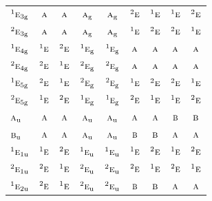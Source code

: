 \documentclass[10pt,a4paper]{article}
\numberwithin{equation}{section}
\newcommand{\irr}[1]{\text{\normalfont\scshape #1}}
\newcommand{\conjpair}[1]{{}^{#1}}
\newcommand{\ptag}[1]{\mathrm{#1}}
\begin{document}
{\begin{longtable}{@{}lcccccccc@{}}
$\conjpair{1}\irr{e}_{3\ptag{g}}$ & $\irr{a}$ & $\irr{a}$ & $\irr{a}_{\ptag{g}}$ & $\irr{a}_{\ptag{g}}$ & $\conjpair{2}\irr{e}$ & $\conjpair{1}\irr{e}$ & $\conjpair{1}\irr{e}$ & $\conjpair{2}\irr{e}$\\
$\conjpair{2}\irr{e}_{3\ptag{g}}$ & $\irr{a}$ & $\irr{a}$ & $\irr{a}_{\ptag{g}}$ & $\irr{a}_{\ptag{g}}$ & $\conjpair{1}\irr{e}$ & $\conjpair{2}\irr{e}$ & $\conjpair{2}\irr{e}$ & $\conjpair{1}\irr{e}$\\
$\conjpair{1}\irr{e}_{4\ptag{g}}$ & $\conjpair{1}\irr{e}$ & $\conjpair{2}\irr{e}$ & $\conjpair{1}\irr{e}_{\ptag{g}}$ & $\conjpair{1}\irr{e}_{\ptag{g}}$ & $\irr{a}$ & $\irr{a}$ & $\irr{a}$ & $\irr{a}$\\
$\conjpair{2}\irr{e}_{4\ptag{g}}$ & $\conjpair{2}\irr{e}$ & $\conjpair{1}\irr{e}$ & $\conjpair{2}\irr{e}_{\ptag{g}}$ & $\conjpair{2}\irr{e}_{\ptag{g}}$ & $\irr{a}$ & $\irr{a}$ & $\irr{a}$ & $\irr{a}$\\
$\conjpair{1}\irr{e}_{5\ptag{g}}$ & $\conjpair{2}\irr{e}$ & $\conjpair{1}\irr{e}$ & $\conjpair{2}\irr{e}_{\ptag{g}}$ & $\conjpair{2}\irr{e}_{\ptag{g}}$ & $\conjpair{1}\irr{e}$ & $\conjpair{2}\irr{e}$ & $\conjpair{2}\irr{e}$ & $\conjpair{1}\irr{e}$\\
$\conjpair{2}\irr{e}_{5\ptag{g}}$ & $\conjpair{1}\irr{e}$ & $\conjpair{2}\irr{e}$ & $\conjpair{1}\irr{e}_{\ptag{g}}$ & $\conjpair{1}\irr{e}_{\ptag{g}}$ & $\conjpair{2}\irr{e}$ & $\conjpair{1}\irr{e}$ & $\conjpair{1}\irr{e}$ & $\conjpair{2}\irr{e}$\\
$\irr{a}_{\ptag{u}}$ & $\irr{a}$ & $\irr{a}$ & $\irr{a}_{\ptag{u}}$ & $\irr{a}_{\ptag{u}}$ & $\irr{a}$ & $\irr{a}$ & $\irr{b}$ & $\irr{b}$\\
$\irr{b}_{\ptag{u}}$ & $\irr{a}$ & $\irr{a}$ & $\irr{a}_{\ptag{u}}$ & $\irr{a}_{\ptag{u}}$ & $\irr{b}$ & $\irr{b}$ & $\irr{a}$ & $\irr{a}$\\
$\conjpair{1}\irr{e}_{1\ptag{u}}$ & $\conjpair{1}\irr{e}$ & $\conjpair{2}\irr{e}$ & $\conjpair{1}\irr{e}_{\ptag{u}}$ & $\conjpair{1}\irr{e}_{\ptag{u}}$ & $\conjpair{1}\irr{e}$ & $\conjpair{2}\irr{e}$ & $\conjpair{1}\irr{e}$ & $\conjpair{2}\irr{e}$\\
$\conjpair{2}\irr{e}_{1\ptag{u}}$ & $\conjpair{2}\irr{e}$ & $\conjpair{1}\irr{e}$ & $\conjpair{2}\irr{e}_{\ptag{u}}$ & $\conjpair{2}\irr{e}_{\ptag{u}}$ & $\conjpair{2}\irr{e}$ & $\conjpair{1}\irr{e}$ & $\conjpair{2}\irr{e}$ & $\conjpair{1}\irr{e}$\\
$\conjpair{1}\irr{e}_{2\ptag{u}}$ & $\conjpair{2}\irr{e}$ & $\conjpair{1}\irr{e}$ & $\conjpair{2}\irr{e}_{\ptag{u}}$ & $\conjpair{2}\irr{e}_{\ptag{u}}$ & $\irr{b}$ & $\irr{b}$ & $\irr{a}$ & $\irr{a}$\\

\end{longtable}}
\end{document}
